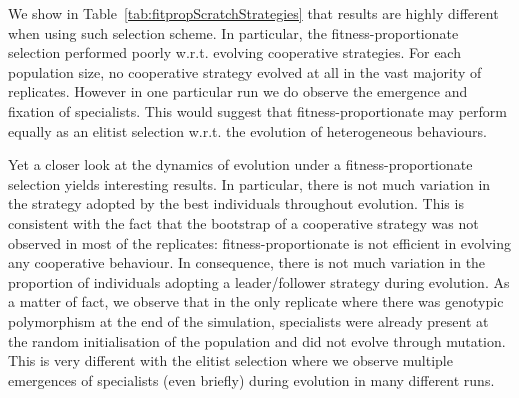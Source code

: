       \begin{table}[hbtp]
        \caption{\textbf{Strategies evolved by the best individuals under fitness-proportionate selection with an initially random population.} Repartition of the different strategies adopted by the best individuals at the last evaluation in each of the replicates for different population sizes. We indicate in each cell the number of simulations where a particular strategy evolved. Populations were evolved under a fitness-proportionate selection. Individuals' genotype values were initially random. In the table "L/F" stands for leader/follower and "NC" for "Non-Cooperative".}
        \label{tab:fitpropScratchStrategies}
      \end{table}

      We show in Table~\ref{tab:fitpropScratchStrategies} that results are highly different when using such selection scheme. In particular, the fitness-proportionate selection performed poorly w.r.t. evolving cooperative strategies. For each population size, no cooperative strategy evolved at all in the vast majority of replicates. However in one particular run we do observe the emergence and fixation of specialists. This would suggest that fitness-proportionate may perform equally as an elitist selection w.r.t. the evolution of heterogeneous behaviours. 

      Yet a closer look at the dynamics of evolution under a fitness-proportionate selection yields interesting results. In particular, there is not much variation in the strategy adopted by the best individuals throughout evolution. This is consistent with the fact that the bootstrap of a cooperative strategy was not observed in most of the replicates: fitness-proportionate is not efficient in evolving any cooperative behaviour. In consequence, there is not much variation in the proportion of individuals adopting a leader/follower strategy during evolution. As a matter of fact, we observe that in the only replicate where there was genotypic polymorphism at the end of the simulation, specialists were already present at the random initialisation of the population and did not evolve through mutation. This is very different with the elitist selection where we observe multiple emergences of specialists (even briefly) during evolution in many different runs.


